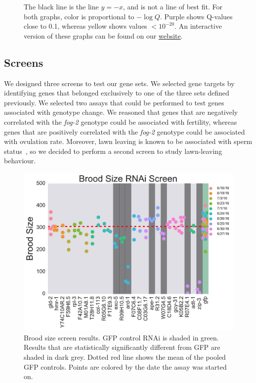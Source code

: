 \documentclass[9pt,twocolumn,twoside]{gsag3jnl}
\newcommand{\fog}{\emph{fog-2}}
\newcommand{\webref}{\href{https://wormlabcaltech.github.io/Angeles_Leighton_2016/}{website}}
\begin{document}
\begin{figure}[htbp]
{The black line is the line $y=-x$, and is not a line of best fit. For both graphs, color is proportional to $-\log{Q}$. Purple shows Q-values close to 0.1, whereas yellow shows values $<10^{-20}$.
An interactive version of these graphs can be found on our \webref{}.
}%
\label{fig:aberrant_aging}
\end{figure}


\subsection*{Screens}
\label{subs:Screens}

We designed three screens to test our gene sets. We selected gene targets by identifying genes that belonged exclusively to one of the three sets defined previously. We selected two assays that could be performed to test genes associated with genotype change. We reasoned that genes that are negatively correlated with the \fog{} genotype could be associated with fertility, whereas genes that are positively correlated with the \fog{} genotype could be associated with ovulation rate. Moreover, lawn leaving is known to be associated with sperm status~\citep{}, so we decided to perform a second screen to study lawn-leaving behaviour.

\begin{figure}[htbp]
\renewcommand{\familydefault}{\sfdefault}\normalfont{}
\centering
\includegraphics[width=\linewidth]{../output/figs/final_figs/rnai_brood_assay_results.pdf}
\caption{Brood size screen results. GFP control RNAi is shaded in green. Results that are statistically significantly different from GFP are shaded in dark grey. Dotted red line shows the mean of the pooled GFP controls. Points are colored by the date the assay was started on.
}%
\label{fig:broodassay}
\end{figure}
\end{document}
